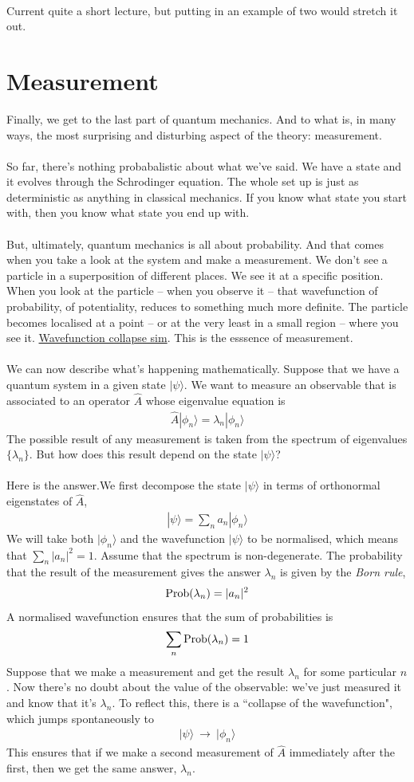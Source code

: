 \documentclass[12pt]{article}
\def\be{\begin{eqnarray}}
\def\ee{\end{eqnarray}}
\newcommand{\nn}{\nonumber}
\newcommand\para{\paragraph{}}
\newcommand{\ket}[1]{|#1\rangle}
\newcommand{\co}{\color{olive}}
\newcommand{\cred}{\color{red}}
\begin{document}
{\para
{\cred Current quite a short lecture, but putting in an example of two would stretch it out.}

\newpage
\section{Measurement}

Finally, we get to the last part of quantum mechanics. And to what is, in many ways, the most surprising and disturbing aspect of the theory: measurement.

\para
So far, there's nothing probabalistic about what we've said. We have a state and it evolves through the Schrodinger equation. The whole set up is just as deterministic as anything in classical mechanics. If you know what state you start with, then you know what state you end up with. 

\para
But, ultimately, quantum mechanics is all about probability. And that comes when you take a look at the system and make a measurement. We don't see a particle in a superposition of different places. We see it at a specific position. When you look at the particle -- when you observe it -- that wavefunction of probability, of potentiality, reduces to something much more definite. The particle becomes localised at a point -- or at the very least in a small region -- where you see it. \href{https://capacity-simulations.github.io/simulations/Sims-v1/wavefunction_collapse.html}{Wavefunction collapse sim}. This is the esssence of measurement.

\para
We can now describe what's happening mathematically.  {\co 
Suppose that we have a quantum system in a given state $\ket{\psi}$. We want to measure an observable that is associated to an operator $\hat{A}$ whose eigenvalue equation is
%
\be \hat{A} \ket{\phi_n} = \lambda_n\ket{\phi_n}\nn\ee
%
The possible result of any measurement is taken from the spectrum of eigenvalues $\{\lambda_n\}$. But how does this result depend on the state $\ket{\psi}$?
}

\para
Here is the answer.{\co We first decompose the state $\ket{\psi}$ in terms of orthonormal eigenstates of $\hat{A}$, 
%
\be \ket{\psi} = \sum_{n} a_n\ket{\phi_n}\nn\ee
%
We will take both $\ket{\phi_n}$ and the wavefunction $\ket{\psi}$ to be normalised, which means that $\sum_n|a_n|^2=1$. Assume that the spectrum is non-degenerate. The probability that the result of the measurement gives the answer $\lambda_n$ is given by the {\it Born rule},
%
\be {\rm Prob}(\lambda_n) = |a_n|^2\nn\ee
%
A normalised wavefunction ensures that the sum of probabilities is 
%
\be \sum_n{\rm Prob}(\lambda_n)=1\nn\ee
%
Suppose that we make a measurement and get the result $\lambda_n$ for some particular $n$.  Now there's no doubt about the value of the observable: we've just measured it and know that it's $\lambda_n$. To reflect this, there is a ``collapse of the wavefunction", which jumps spontaneously to
%
\be \ket{\psi} \ \longrightarrow \ \ket{\phi_n}\nn\ee
%
This ensures that if we make a second  measurement of  $\hat{A}$ immediately after the first, then we get the same answer, $\lambda_n$.}

}
\end{document}
